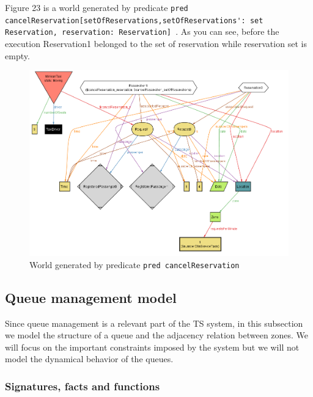 \begin{landscape}

Figure 23 is a world generated by predicate \lstinline!pred cancelReservation[setOfReservations,setOfReservations': set Reservation, reservation: Reservation] !.
As you can see, before the execution Reservation1 belonged to the
set of reservation while reservation set is empty.

\begin{figure}[H]
\begin{centering}
\includegraphics[scale=0.5]{alloy/instances/cancelReservation}
\par\end{centering}

\protect\caption{World generated by predicate \lstinline!pred cancelReservation!}
\end{figure}


\end{landscape}

\clearpage{}


\subsection{Queue management model}

Since queue management is a relevant part of the TS system, in this
subsection we model the structure of a queue and the adjacency relation
between zones. We will focus on the important constraints imposed
by the system but we will not model the dynamical behavior of the
queues.


\subsubsection{Signatures, facts and functions}

